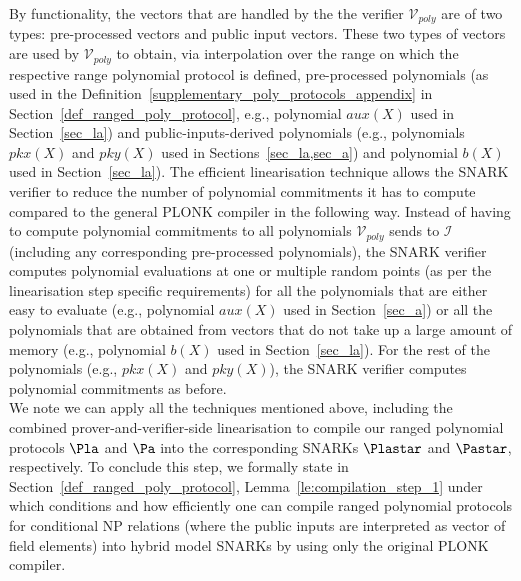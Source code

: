 \noindent By functionality, the vectors that are handled by the the verifier $\mathcal{V}_{poly}$ are 
of two types: pre-processed vectors and public input vectors. These two types of vectors are used by $\mathcal{V}_{poly}$ 
to obtain, via interpolation over the range on which the respective range polynomial protocol is defined, pre-processed polynomials 
(as used in the Definition~\ref{supplementary_poly_protocols_appendix} in Section~\ref{def_ranged_poly_protocol}, e.g., polynomial $aux(X)$ used in Section~\ref{sec_la}) and 
public-inputs-derived polynomials (e.g., polynomials $pkx(X)$ and $pky(X)$ used in Sections~\ref{sec_la,sec_a})
and polynomial $b(X)$ used in Section~\ref{sec_la}). The efficient linearisation technique allows the SNARK verifier to reduce the 
number of polynomial commitments it has to compute compared to the general PLONK compiler in the following way. Instead of 
having to compute polynomial commitments to all polynomials $\mathcal{V}_{poly}$ sends to $\mathcal{I}$ (including any corresponding 
pre-processed polynomials), the SNARK verifier computes polynomial evaluations at one or multiple random points (as per the linearisation 
step specific requirements) for all the polynomials that are either easy to evaluate (e.g., polynomial $aux(X)$ used in Section~\ref{sec_a}) or 
all the polynomials that are obtained from vectors that do not take up a large amount of memory (e.g., polynomial $b(X)$ used in Section~\ref{sec_la}). 
For the rest of the polynomials (e.g., $\mathit{pkx}(X)$ and $\mathit{pky}(X)$), the SNARK verifier computes polynomial commitments as before.\\

\noindent We note we can apply all the techniques mentioned above, including the combined prover-and-verifier-side linearisation 
to compile our ranged polynomial protocols $\Pla$ and $\Pa$ into the corresponding SNARKs $\Plastar$ and $\Pastar$, respectively. 
To conclude this step, we formally state in Section~\ref{def_ranged_poly_protocol}, Lemma~\ref{le:compilation_step_1} under which conditions and how efficiently 
one can compile ranged polynomial protocols for conditional NP relations (where the public inputs are interpreted as vector of field elements) 
into hybrid model SNARKs by using only the original PLONK compiler. \\
